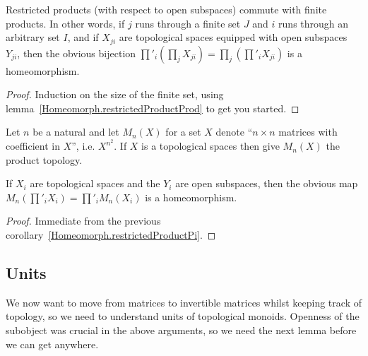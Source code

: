 \begin{corollary}
  \label{Homeomorph.restrictedProductPi}
  \leanok
  Restricted products (with respect to open subspaces) commute with finite products.
  In other words, if $j$ runs through a finite set $J$ and $i$ runs through an arbitrary
  set $I$, and if $X_{ji}$ are topological spaces equipped with open subspaces $Y_{ji}$,
  then the obvious bijection $\prod'_i(\prod_j X_{ji})=\prod_j\left(\prod'_i X_{ji}\right)$
  is a homeomorphism.
\end{corollary}
\begin{proof}
  Induction on the size of the finite set, using lemma~\ref{Homeomorph.restrictedProductProd}
  to get you started.
\end{proof}

 Let $n$ be a natural and let $M_n(X)$ for a set $X$ denote ``$n\times n$
  matrices with coefficient in $X$'', i.e. $X^{n^2}$. If $X$ is a topological
  spaces then give $M_n(X)$ the product topology.

\begin{corollary}
  \label{Homeomorph.restrictedProductMatrix}
  \leanok
  If $X_i$ are topological spaces and the $Y_i$ are open subspaces,
  then the obvious map $M_n(\prod'_iX_i)=\prod'_iM_n(X_i)$ is a homeomorphism.
\end{corollary}
\begin{proof}
  Immediate from the previous corollary~\ref{Homeomorph.restrictedProductPi}.
\end{proof}

\subsection{Units}

We now want to move from matrices to invertible matrices whilst keeping track of topology,
so we need to understand units of topological monoids. Openness of the subobject was
crucial in the above arguments, so we need the next lemma before we can get anywhere.

